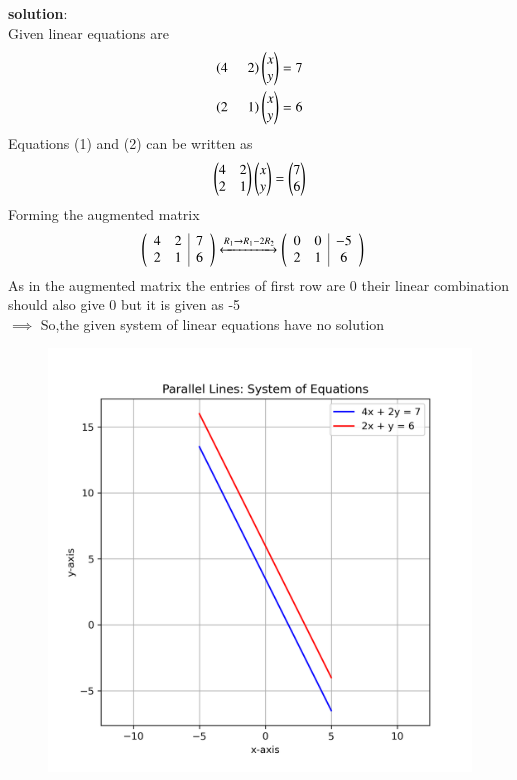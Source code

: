 \documentclass[journal]{IEEEtran}
\begin{document}
\textbf{solution}:\\
Given linear equations are
\begin{align}
    \left(4\hspace{0.5cm} 2\right)\begin{pmatrix}x\\y\end{pmatrix}=7\\
     \left(2\hspace{0.5cm} 1\right)\begin{pmatrix}x\\y\end{pmatrix}=6
\end{align}
Equations (1) and (2) can be written as
\begin{align}
    \begin{pmatrix}
        4 & 2\\
        2 & 1
    \end{pmatrix} \begin{pmatrix}x\\y\end{pmatrix}=\begin{pmatrix}7\\6\end{pmatrix}
\end{align}
Forming the augmented matrix
\begin{align}
     \left(\begin{array}{cc|c}
        4 & 2 & 7 \\
        2 & 1 & 6 
\end{array}\right) &\xleftrightarrow{R_1 \rightarrow R_1-2R_2}  \left(\begin{array}{cc|c}
        0 & 0 & -5 \\
        2 & 1 & 6 
\end{array}\right)
\end{align}
As in the augmented matrix the entries of first row are 0 their linear combination should also give 0 but it is given as  -5\\
$\implies$ So,the given system of linear equations have no solution
\begin{figure}
    \centering
    \includegraphics[width=0.54\columnwidth]{figs/01.png}
    \caption{}
    \label{fig:placeholder}
\end{figure}
\end{document}
